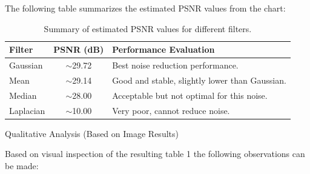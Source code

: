 \documentclass[a4paper,12pt]{article}
\begin{document}
The following table summarizes the estimated PSNR values from the chart:

\begin{table}[h]
\centering
\footnotesize
\begin{tabular}{|l|c|p{6cm}|}
\hline
\textbf{Filter} & \textbf{PSNR (dB)} & \textbf{Performance Evaluation} \\ \hline
Gaussian & $\sim$29.72 & Best noise reduction performance. \\ \hline
Mean & $\sim$29.14 & Good and stable, slightly lower than Gaussian. \\ \hline
Median & $\sim$28.00 & Acceptable but not optimal for this noise. \\ \hline
Laplacian & $\sim$10.00 & Very poor, cannot reduce noise. \\ \hline
\end{tabular}
\caption{Summary of estimated PSNR values for different filters.}
\label{tab:psnr_summary}
\end{table}

{Qualitative Analysis (Based on Image Results)}

Based on visual inspection of the resulting table 1 the following observations can be made:
\end{document}
